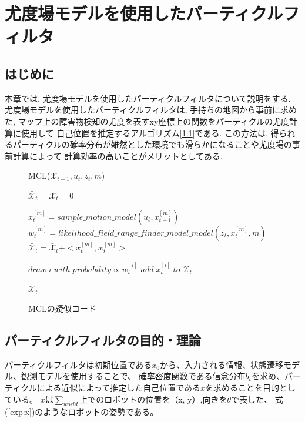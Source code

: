\chapter{尤度場モデルを使用したパーティクルフィルタ}
\section{はじめに}
本章では, 尤度場モデルを使用したパーティクルフィルタについて説明をする. 
尤度場モデルを使用したパーティクルフィルタは, 手持ちの地図から事前に求めた, 
マップ上の障害物検知の尤度を表すxy座標上の関数をパーティクルの尤度計算に使用して
自己位置を推定するアルゴリズム[\ref{alg:mcl}]である. 
この方法は, 得られるパーティクルの確率分布が雑然とした環境でも滑らかになることや尤度場の事前計算によって
計算効率の高いことがメリットとしてある. 

\begin{figure}[h]
  \begin{algorithm}[H]
      \caption{MCL($\mathcal{X}_{t-1}, u_t, z_t, m$)}
      \label{alg:mcl}
      \begin{algorithmic}
      \STATE $\mathcal{\bar{X}}_t = \mathcal{X}_t = 0$

      \STATE $x_{t}^{[m]} = sample\_motion\_model(u_{t}, x_{t-1}^{[m]})$
      \STATE $w_{t}^{[m]} = likelihood\_field\_range\_finder\_model\_model(z_{t}, x_{t}^{[m]}, m)$
      \STATE $\mathcal{\bar{X}}_t = \mathcal{\bar{X}}_t + <x_{t}^{[m]}, w_{t}^{[m]}>$
      \ENDFOR

      \STATE $draw\;i\;with\;probability \propto w_{t}^{[i]}$
      \STATE $add\; x_{t}^{[i]}\;to\;\mathcal{X}_t$
      \ENDFOR

      \RETURN $\mathcal{X}_t$
      \end{algorithmic}
  \end{algorithm}
  \caption{MCLの疑似コード}
\end{figure}

\section{パーティクルフィルタの目的・理論}

パーティクルフィルタは初期位置である$x_0$から、入力される情報、状態遷移モデル、観測モデルを使用することで、
確率密度関数である信念分布$b_t$を求め、パーティクルによる近似によって推定した自己位置である$x$を求めることを目的としている。
$x$は$\sum_{world}$上でのロボットの位置を（x, y）,向きを$\theta$で表した、
式(\ref{exp:x})のようなロボットの姿勢である。

